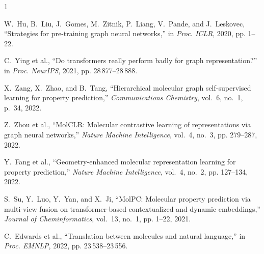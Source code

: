 \documentclass[journal]{IEEEtran}
\begin{document}
\begin{thebibliography}{1}

W.~Hu, B.~Liu, J.~Gomes, M.~Zitnik, P.~Liang, V.~Pande, and J.~Leskovec,
  ``Strategies for pre-training graph neural networks,'' in \emph{Proc. ICLR},
  2020, pp. 1--22.

C.~Ying et al., ``Do transformers really perform badly for graph representation?''
  in \emph{Proc. NeurIPS}, 2021, pp. 28\,877--28\,888.

X.~Zang, X.~Zhao, and B.~Tang, ``Hierarchical molecular graph self-supervised
  learning for property prediction,'' \emph{Communications Chemistry}, vol.~6,
  no.~1, p.~34, 2022.

Z.~Zhou et al., ``MolCLR: Molecular contrastive learning of representations via
  graph neural networks,'' \emph{Nature Machine Intelligence}, vol.~4, no.~3,
  pp. 279--287, 2022.

Y.~Fang et al., ``Geometry-enhanced molecular representation learning for
  property prediction,'' \emph{Nature Machine Intelligence}, vol.~4, no.~2,
  pp. 127--134, 2022.

S.~Su, Y.~Luo, Y.~Yan, and X.~Ji, ``MolPC: Molecular property prediction via
  multi-view fusion on transformer-based contextualized and dynamic embeddings,''
  \emph{Journal of Cheminformatics}, vol.~13, no.~1, pp. 1--22, 2021.

C.~Edwards et al., ``Translation between molecules and natural language,''
  in \emph{Proc. EMNLP}, 2022, pp. 23\,538--23\,556.

\end{thebibliography}

\end{document}

